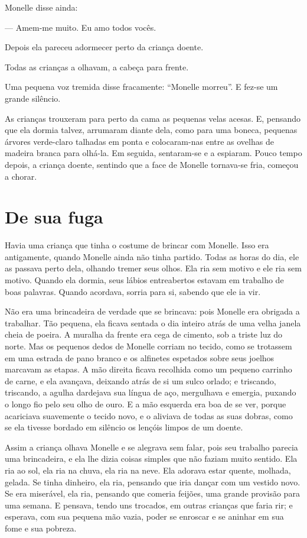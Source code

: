 Monelle disse ainda:

--- Amem-me muito. Eu amo todos vocês.

Depois ela pareceu adormecer perto da criança doente.

Todas as crianças a olhavam, a cabeça para frente.

Uma pequena voz tremida disse fracamente: “Monelle morreu”. E fez-se um
grande silêncio.

As crianças trouxeram para perto da cama as pequenas velas acesas. E,
pensando que ela dormia talvez, arrumaram diante dela, como para uma
boneca, pequenas árvores verde-claro talhadas em ponta e colocaram-nas
entre as ovelhas de madeira branca para olhá-la. Em seguida, sentaram-se e
a espiaram. Pouco tempo depois, a criança doente, sentindo que a face de
Monelle tornava-se fria, começou a chorar.

\section{De sua fuga}

Havia uma criança que tinha o costume de brincar com Monelle. Isso era
antigamente, quando Monelle ainda não tinha partido. Todas as horas do
dia, ele as passava perto dela, olhando tremer seus olhos. Ela ria sem
motivo e ele ria sem motivo. Quando ela dormia, seus lábios entreabertos
estavam em trabalho de boas palavras. Quando acordava, sorria para si,
sabendo que ele ia vir.

Não era uma brincadeira de verdade que se brincava: pois Monelle era
obrigada a trabalhar. Tão pequena, ela ficava sentada o dia inteiro atrás
de uma velha janela cheia de poeira. A muralha da frente era cega de
cimento, sob a triste luz do norte. Mas os pequenos dedos de Monelle
corriam no tecido, como se trotassem em uma estrada de pano branco e os
alfinetes espetados sobre seus joelhos marcavam as etapas. A mão direita
ficava recolhida como um pequeno carrinho de carne, e ela avançava,
deixando atrás de si um sulco orlado; e triscando, triscando, a agulha
dardejava sua língua de aço, mergulhava e emergia, puxando o longo fio
pelo seu olho de ouro. E a mão esquerda era boa de se ver, porque
acariciava suavemente o tecido novo, e o aliviava de todas as suas dobras,
como se ela tivesse bordado em silêncio os lençóis limpos de um doente.

Assim a criança olhava Monelle e se alegrava sem falar, pois seu
trabalho parecia uma brincadeira, e ela lhe dizia coisas simples que não
faziam muito sentido. Ela ria ao sol, ela ria na chuva, ela ria na neve.
Ela adorava estar quente, molhada, gelada. Se tinha dinheiro, ela ria,
pensando que iria dançar com um vestido novo. Se era miserável, ela ria,
pensando que comeria feijões, uma grande provisão para uma semana. E
pensava, tendo uns trocados, em outras crianças que faria rir; e esperava,
com sua pequena mão vazia, poder se enroscar e se aninhar em sua fome e
sua pobreza.

